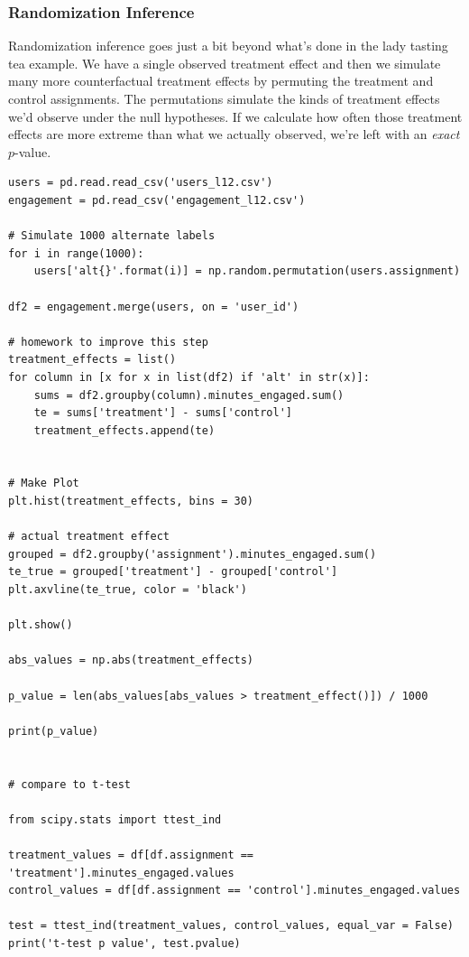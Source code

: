 \subsubsection{Randomization Inference}

Randomization inference goes just a bit beyond what's done in the lady tasting tea example. We have a single observed treatment effect and then we simulate many more counterfactual treatment effects by permuting the treatment and control assignments. The permutations simulate the kinds of treatment effects we'd observe under the null hypotheses. If we calculate how often those treatment effects are more extreme than what we actually observed, we're left with an \emph{exact} $p$-value. 

\begin{lstlisting}
users = pd.read.read_csv('users_l12.csv')
engagement = pd.read_csv('engagement_l12.csv')

# Simulate 1000 alternate labels
for i in range(1000):
    users['alt{}'.format(i)] = np.random.permutation(users.assignment)
    
df2 = engagement.merge(users, on = 'user_id')

# homework to improve this step
treatment_effects = list()
for column in [x for x in list(df2) if 'alt' in str(x)]:
    sums = df2.groupby(column).minutes_engaged.sum()
    te = sums['treatment'] - sums['control']
    treatment_effects.append(te)


# Make Plot
plt.hist(treatment_effects, bins = 30)

# actual treatment effect
grouped = df2.groupby('assignment').minutes_engaged.sum()
te_true = grouped['treatment'] - grouped['control']
plt.axvline(te_true, color = 'black')

plt.show()

abs_values = np.abs(treatment_effects)

p_value = len(abs_values[abs_values > treatment_effect()]) / 1000

print(p_value)


# compare to t-test

from scipy.stats import ttest_ind

treatment_values = df[df.assignment == 'treatment'].minutes_engaged.values
control_values = df[df.assignment == 'control'].minutes_engaged.values

test = ttest_ind(treatment_values, control_values, equal_var = False)
print('t-test p value', test.pvalue)
\end{lstlisting}